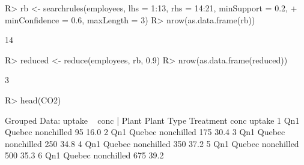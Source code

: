 \documentclass{article}\usepackage[]{graphicx}\usepackage[]{color}
\begin{document}
\begin{Schunk}
% --begin: "reduce"
\begin{Sinput}
R> rb <- searchrules(employees, lhs = 1:13, rhs = 14:21, minSupport = 0.2, 
+      minConfidence = 0.6, maxLength = 3)
R> nrow(as.data.frame(rb))
\end{Sinput}
\begin{Soutput}
[1] 14
\end{Soutput}
\begin{Sinput}
R> reduced <- reduce(employees, rb, 0.9)
R> nrow(as.data.frame(reduced))
\end{Sinput}
\begin{Soutput}
[1] 3
\end{Soutput}
%
% --end: "reduce"
\end{Schunk}

\begin{Schunk}
% --begin: "pbld1"
\begin{Sinput}
R> head(CO2)
\end{Sinput}
\begin{Soutput}
Grouped Data: uptake ~ conc | Plant
  Plant   Type  Treatment conc uptake
1   Qn1 Quebec nonchilled   95   16.0
2   Qn1 Quebec nonchilled  175   30.4
3   Qn1 Quebec nonchilled  250   34.8
4   Qn1 Quebec nonchilled  350   37.2
5   Qn1 Quebec nonchilled  500   35.3
6   Qn1 Quebec nonchilled  675   39.2
\end{Soutput}
%
% --end: "pbld1"
\end{Schunk}
\end{document}
